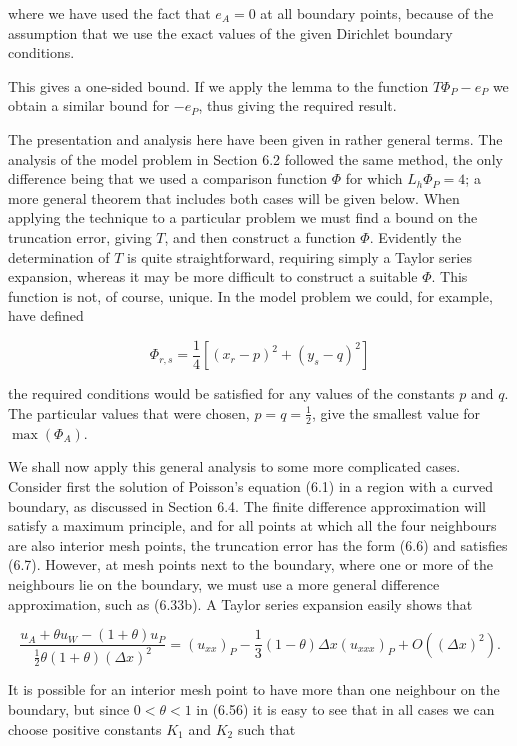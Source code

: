 \documentclass[10pt]{article}
\begin{document}
where we have used the fact that \(e_{A}=0\) at all boundary points, because of the assumption that we use the exact values of the given Dirichlet boundary conditions.

This gives a one-sided bound. If we apply the lemma to the function \(T \Phi_{P}-e_{P}\) we obtain a similar bound for \(-e_{P}\), thus giving the required result.

The presentation and analysis here have been given in rather general terms. The analysis of the model problem in Section 6.2 followed the same method, the only difference being that we used a comparison function \(\Phi\) for which \(L_{h} \Phi_{P}=4\); a more general theorem that includes both cases will be given below. When applying the technique to a particular problem we must find a bound on the truncation error, giving \(T\), and then construct a function \(\Phi\). Evidently the determination of \(T\) is quite straightforward, requiring simply a Taylor series expansion, whereas it may be more difficult to construct a suitable \(\Phi\). This function is not, of course, unique. In the model problem we could, for example, have defined

\[
\Phi_{r, s}=\frac{1}{4}\left[\left(x_{r}-p\right)^{2}+\left(y_{s}-q\right)^{2}\right]
\]

the required conditions would be satisfied for any values of the constants \(p\) and \(q\). The particular values that were chosen, \(p=q=\frac{1}{2}\), give the smallest value for \(\max \left(\Phi_{A}\right)\).

We shall now apply this general analysis to some more complicated cases. Consider first the solution of Poisson's equation (6.1) in a region with a curved boundary, as discussed in Section 6.4. The finite difference approximation will satisfy a maximum principle, and for all points at which all the four neighbours are also interior mesh points, the truncation error has the form (6.6) and satisfies (6.7). However, at mesh points next to the boundary, where one or more of the neighbours lie on the boundary, we must use a more general difference approximation, such as (6.33b). A Taylor series expansion easily shows that

\[
\frac{u_{A}+\theta u_{W}-(1+\theta) u_{P}}{\frac{1}{2} \theta(1+\theta)(\Delta x)^{2}}=\left(u_{x x}\right)_{P}-\frac{1}{3}(1-\theta) \Delta x\left(u_{x x x}\right)_{P}+O\left((\Delta x)^{2}\right) .
\]

It is possible for an interior mesh point to have more than one neighbour on the boundary, but since \(0<\theta<1\) in (6.56) it is easy to see that in all cases we can choose positive constants \(K_{1}\) and \(K_{2}\) such that
\end{document}
